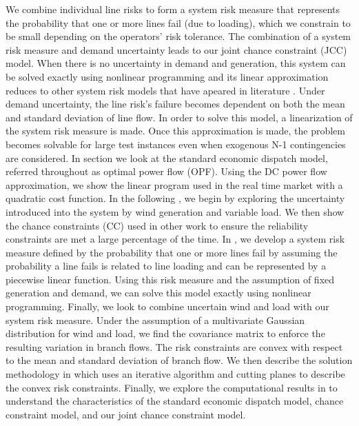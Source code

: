 We combine individual line risks to form a system risk measure that represents the probability that one or more lines fail (due to loading), which we constrain to be small depending on the operators' risk tolerance.  The combination of a system risk measure and demand uncertainty leads to our joint chance constraint (JCC) model.  When there is no uncertainty in demand and generation, this  system can be solved exactly using nonlinear programming and its linear approximation reduces to other system risk models that have apeared in literature \cite{vrakopoulou_2013c,wang_2013}.  Under demand uncertainty, the line risk's failure becomes dependent on both the mean and standard deviation of line flow. In order to solve this model, a linearization of the system risk measure is made.  Once this approximation is made, the problem becomes solvable for large test instances even when exogenous N-1 contingencies are considered.  
In section  we look at the standard economic dispatch model, referred throughout as optimal power flow (OPF).  Using the DC power flow approximation, we show the linear program used in the real time market with a quadratic cost function. In the following , we begin by exploring the uncertainty introduced into the system by wind generation and variable load.  We then show the chance constraints (CC) used in other work to ensure the reliability constraints are met a large percentage of the time.  In , we develop a system risk measure defined by the probability that one or more lines fail by assuming the probability a line fails is related to line loading and can be represented by a piecewise linear function.  Using this risk measure and the assumption of fixed generation and demand, we can solve this model exactly using nonlinear programming.  Finally, we look to combine uncertain wind and load with our system risk measure.  Under the assumption of a multivariate Gaussian distribution for wind and load, we find the covariance matrix to enforce the resulting variation in branch flows.  The risk constraints are convex with respect to the mean and standard deviation of branch flow.  We then describe the solution methodology in   which uses an iterative algorithm and cutting planes to describe the convex risk constraints.  Finally, we explore the computational results in  to understand the characteristics of the standard economic dispatch model, chance constraint model, and our joint chance constraint model.


